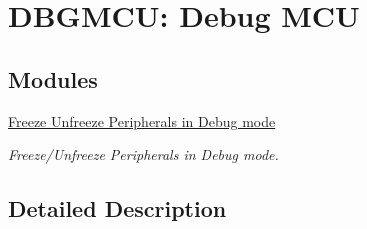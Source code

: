 \hypertarget{group___d_b_g_m_c_u___macros}{\section{D\-B\-G\-M\-C\-U\-: Debug M\-C\-U}
\label{group___d_b_g_m_c_u___macros}
}
\subsection*{Modules}
\begin{DoxyCompactItemize}
\item 
\hyperlink{group___d_b_g_m_c_u___freeze___unfreeze}{Freeze Unfreeze Peripherals in Debug mode}
\begin{DoxyCompactList}\small\item\em Freeze/\-Unfreeze Peripherals in Debug mode. \end{DoxyCompactList}\end{DoxyCompactItemize}


\subsection{Detailed Description}
